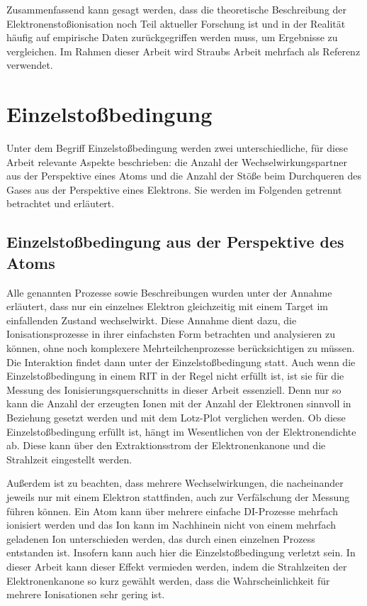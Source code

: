 Zusammenfassend kann gesagt werden, dass die theoretische Beschreibung der Elektronenstoßionisation noch Teil aktueller Forschung ist und in der Realität häufig auf empirische Daten zurückgegriffen werden muss, um Ergebnisse zu vergleichen. Im Rahmen dieser Arbeit wird Straubs Arbeit \cite{Straub} mehrfach als Referenz verwendet. 

\section{Einzelstoßbedingung}
\label{chap:Einzelstoß}
Unter dem Begriff Einzelstoßbedingung werden zwei unterschiedliche, für diese Arbeit relevante Aspekte beschrieben: die Anzahl der Wechselwirkungspartner aus der Perspektive eines Atoms und die Anzahl der Stöße beim Durchqueren des Gases aus der Perspektive eines Elektrons. Sie werden im Folgenden getrennt betrachtet und erläutert.

\subsection{Einzelstoßbedingung aus der Perspektive des Atoms}
Alle genannten Prozesse sowie Beschreibungen wurden unter der Annahme erläutert, dass nur ein einzelnes Elektron gleichzeitig mit einem Target im einfallenden Zustand wechselwirkt. Diese Annahme dient dazu, die Ionisationsprozesse in ihrer einfachsten Form betrachten und analysieren zu können, ohne noch komplexere Mehrteilchenprozesse berücksichtigen zu müssen. Die Interaktion findet dann unter der Einzelstoßbedingung statt. Auch wenn die Einzelstoßbedingung in einem RIT in der Regel nicht erfüllt ist, ist sie für die Messung des Ionisierungsquerschnitts in dieser Arbeit essenziell. Denn nur so kann die Anzahl der erzeugten Ionen mit der Anzahl der Elektronen sinnvoll in Beziehung gesetzt werden und mit dem Lotz-Plot verglichen werden. Ob diese Einzelstoßbedingung erfüllt ist, hängt im Wesentlichen von der Elektronendichte ab. Diese kann über den Extraktionsstrom der Elektronenkanone und die Strahlzeit eingestellt werden.

Außerdem ist zu beachten, dass mehrere Wechselwirkungen, die nacheinander jeweils nur mit einem Elektron stattfinden, auch zur Verfälschung der Messung führen können. Ein Atom kann über mehrere einfache DI-Prozesse mehrfach ionisiert werden und das Ion kann im Nachhinein nicht von einem mehrfach geladenen Ion unterschieden werden, das durch einen einzelnen Prozess entstanden ist. Insofern kann auch hier die Einzelstoßbedingung verletzt sein. In dieser Arbeit kann dieser Effekt vermieden werden, indem die Strahlzeiten der Elektronenkanone so kurz gewählt werden, dass die Wahrscheinlichkeit für mehrere Ionisationen sehr gering ist.

